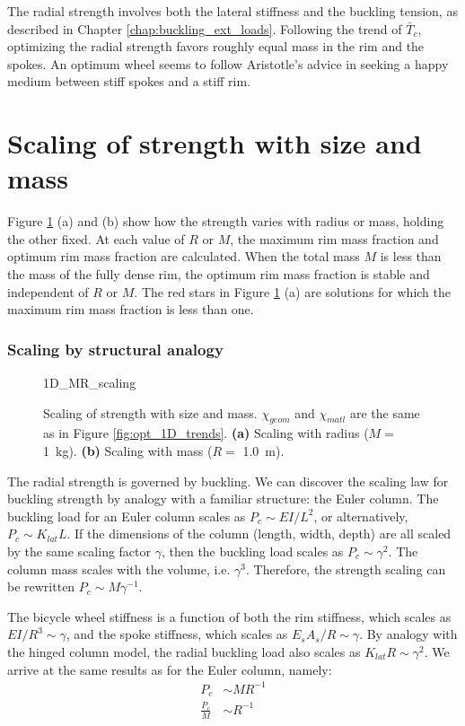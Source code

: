 \documentclass[\rootdir/thesis.tex]{subfiles}
\begin{document}
The radial strength involves both the lateral stiffness and the buckling tension, as described in Chapter \ref{chap:buckling_ext_loads}. Following the trend of $\bar{T}_c$, optimizing the radial strength favors roughly equal mass in the rim and the spokes. An optimum wheel seems to follow Aristotle's advice in seeking a happy medium between stiff spokes and a stiff rim.

\section{Scaling of strength with size and mass}

Figure \ref{fig:opt_1D_scaling} (a) and (b) show how the strength varies with radius or mass, holding the other fixed. At each value of $R$ or $M$, the maximum rim mass fraction and optimum rim mass fraction are calculated. When the total mass $M$ is less than the mass of the fully dense rim, the optimum rim mass fraction is stable and independent of $R$ or $M$. The red stars in Figure \ref{fig:opt_1D_scaling} (a) are solutions for which the maximum rim mass fraction is less than one.

\subsubsection*{Scaling by structural analogy}

\begin{figure}
\centering
{1D_MR_scaling}
\caption{Scaling of strength with size and mass. $\chi_{geom}$ and $\chi_{matl}$ are the same as in Figure \ref{fig:opt_1D_trends}. \textbf{(a)} Scaling with radius ($M=$ \SI{1}{kg}). \textbf{(b)} Scaling with mass ($R=$ \SI{1.0}{m}).}
\label{fig:opt_1D_scaling}
\end{figure}

The radial strength is governed by buckling. We can discover the scaling law for buckling strength by analogy with a familiar structure: the Euler column. The buckling load for an Euler column scales as $P_c \sim EI/L^2$, or alternatively, $P_c \sim K_{lat}L$. If the dimensions of the column (length, width, depth) are all scaled by the same scaling factor $\gamma$, then the buckling load scales as $P_c \sim \gamma^2$. The column mass scales with the volume, i.e. $\gamma^3$. Therefore, the strength scaling can be rewritten $P_c \sim M \gamma^{-1}$.

The bicycle wheel stiffness is a function of both the rim stiffness, which scales as $EI/R^3 \sim \gamma$, and the spoke stiffness, which scales as $E_sA_s/R \sim \gamma$. By analogy with the hinged column model, the radial buckling load also scales as $K_{lat}R \sim \gamma^2$. We arrive at the same results as for the Euler column, namely:
\begin{subequations}
\label{eqn:opt_scaling}
\begin{align}
P_c           &\sim M R^{-1}\\
\frac{P_c}{M} &\sim R^{-1}
\end{align}
\end{subequations}
\end{document}
